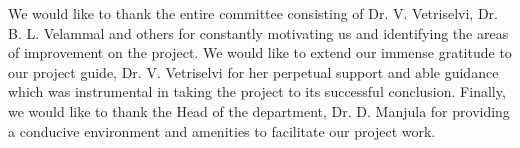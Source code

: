 We would like to thank the entire committee consisting of Dr. V. Vetriselvi, Dr. B. L. Velammal and others for constantly motivating us and identifying the areas of improvement on the project. We would like to extend our immense gratitude to our project guide, Dr. V. Vetriselvi for her perpetual support and able guidance which was instrumental in taking the project to its successful conclusion. Finally, we would like to thank the Head of the department, Dr. D. Manjula for providing a conducive environment and amenities to facilitate our project work.